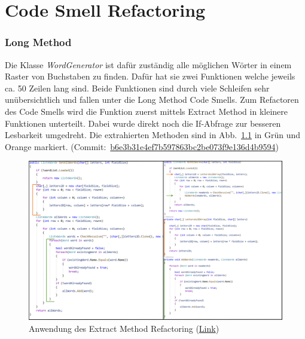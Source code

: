 \chapter{Code Smell Refactoring}

\subsection{Long Method}

Die Klasse \textit{WordGenerator} ist dafür zuständig alle möglichen Wörter in einem Raster von Buchstaben zu finden. Dafür hat sie zwei Funktionen welche jeweils ca. 50 Zeilen lang sind. Beide Funktionen sind durch viele Schleifen sehr unübersichtlich und fallen unter die Long Method Code Smells. Zum Refactoren des Code Smells wird die Funktion zuerst mittels Extract Method in kleinere Funktionen unterteilt. Dabei wurde direkt noch die If-Abfrage zur besseren Lesbarkeit umgedreht. Die extrahierten Methoden sind in Abb.~\ref{Abb:ExtractMethod} in Grün und Orange markiert. (Commit:~\href{https://github.com/EinToni/Wortfinder/commit/b6e3b31e4ef7b597863bc2be073f9e136d4b9594}{b6e3b31e4ef7b597863bc2be073f9e136d4b9594})

\begin{figure}[!ht]
  \centering
  \includegraphics[width=\textwidth]{Bilder/ExtractMethod.PNG}
  \caption[Anwendung des Extract Method Refactoring]{Anwendung des Extract Method Refactoring (\href{https://github.com/EinToni/WortfinderDoku/blob/main/Bilder/ExtractMethod.png}{Link})}
  \label{Abb:ExtractMethod}
\end{figure}

